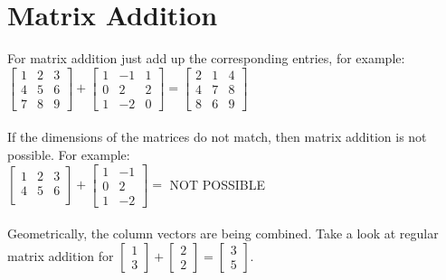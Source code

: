 \documentclass{article}
\begin{document}
\section{Matrix Addition}
For matrix addition just add up the corresponding entries, for example: \\
$\begin{bmatrix}
1 & 2 & 3 \\
4 & 5 & 6 \\
7 & 8 & 9
\end{bmatrix}+\begin{bmatrix}
1 & -1 & 1 \\
0 & 2 & 2 \\
1 & -2 & 0
\end{bmatrix}=
\begin{bmatrix}
2 & 1 & 4 \\
4 & 7 & 8 \\
8 & 6 & 9
\end{bmatrix}$\\\\
If the dimensions of the matrices do not match, then matrix addition is not possible. For example:\\
$\begin{bmatrix}
1 & 2 & 3 \\
4 & 5 & 6 \\
\end{bmatrix}+\begin{bmatrix}
1 & -1  \\
0 & 2 \\
1 & -2
\end{bmatrix}=$ NOT POSSIBLE\\\\
Geometrically, the column vectors are being combined. Take a look at regular matrix addition for $\begin{bmatrix}1 \\ 3 \end{bmatrix} + \begin{bmatrix}2 \\ 2 \end{bmatrix}=\begin{bmatrix}3 \\ 5 \end{bmatrix}$.\\\\
 \\\\
\end{document}
